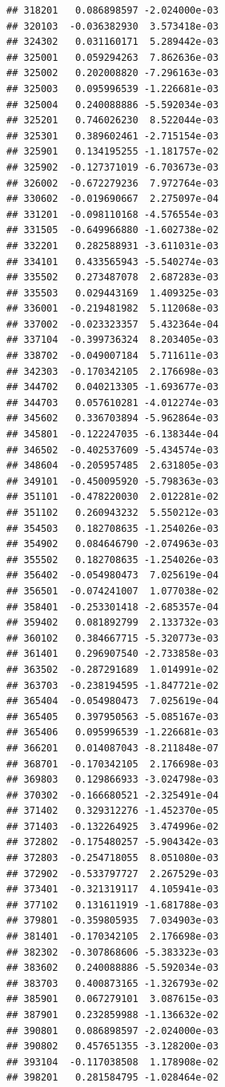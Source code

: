 \documentclass[ignorenonframetext,]{beamer}
\begin{document}
\begin{frame}[fragile]
\begin{verbatim}
## 318201   0.086898597 -2.024000e-03
## 320103  -0.036382930  3.573418e-03
## 324302   0.031160171  5.289442e-03
## 325001   0.059294263  7.862636e-03
## 325002   0.202008820 -7.296163e-03
## 325003   0.095996539 -1.226681e-03
## 325004   0.240088886 -5.592034e-03
## 325201   0.746026230  8.522044e-03
## 325301   0.389602461 -2.715154e-03
## 325901   0.134195255 -1.181757e-02
## 325902  -0.127371019 -6.703673e-03
## 326002  -0.672279236  7.972764e-03
## 330602  -0.019690667  2.275097e-04
## 331201  -0.098110168 -4.576554e-03
## 331505  -0.649966880 -1.602738e-02
## 332201   0.282588931 -3.611031e-03
## 334101   0.433565943 -5.540274e-03
## 335502   0.273487078  2.687283e-03
## 335503   0.029443169  1.409325e-03
## 336001  -0.219481982  5.112068e-03
## 337002  -0.023323357  5.432364e-04
## 337104  -0.399736324  8.203405e-03
## 338702  -0.049007184  5.711611e-03
## 342303  -0.170342105  2.176698e-03
## 344702   0.040213305 -1.693677e-03
## 344703   0.057610281 -4.012274e-03
## 345602   0.336703894 -5.962864e-03
## 345801  -0.122247035 -6.138344e-04
## 346502  -0.402537609 -5.434574e-03
## 348604  -0.205957485  2.631805e-03
## 349101  -0.450095920 -5.798363e-03
## 351101  -0.478220030  2.012281e-02
## 351102   0.260943232  5.550212e-03
## 354503   0.182708635 -1.254026e-03
## 354902   0.084646790 -2.074963e-03
## 355502   0.182708635 -1.254026e-03
## 356402  -0.054980473  7.025619e-04
## 356501  -0.074241007  1.077038e-02
## 358401  -0.253301418 -2.685357e-04
## 359402   0.081892799  2.133732e-03
## 360102   0.384667715 -5.320773e-03
## 361401   0.296907540 -2.733858e-03
## 363502  -0.287291689  1.014991e-02
## 363703  -0.238194595 -1.847721e-02
## 365404  -0.054980473  7.025619e-04
## 365405   0.397950563 -5.085167e-03
## 365406   0.095996539 -1.226681e-03
## 366201   0.014087043 -8.211848e-07
## 368701  -0.170342105  2.176698e-03
## 369803   0.129866933 -3.024798e-03
## 370302  -0.166680521 -2.325491e-04
## 371402   0.329312276 -1.452370e-05
## 371403  -0.132264925  3.474996e-02
## 372802  -0.175480257 -5.904342e-03
## 372803  -0.254718055  8.051080e-03
## 372902  -0.533797727  2.267529e-03
## 373401  -0.321319117  4.105941e-03
## 377102   0.131611919 -1.681788e-03
## 379801  -0.359805935  7.034903e-03
## 381401  -0.170342105  2.176698e-03
## 382302  -0.307868606 -5.383323e-03
## 383602   0.240088886 -5.592034e-03
## 383703   0.400873165 -1.326793e-02
## 385901   0.067279101  3.087615e-03
## 387901   0.232859988 -1.136632e-02
## 390801   0.086898597 -2.024000e-03
## 390802   0.457651355 -3.128200e-03
## 393104  -0.117038508  1.178908e-02
## 398201   0.281584795 -1.028464e-02

\end{verbatim}
\end{frame}
\end{document}
